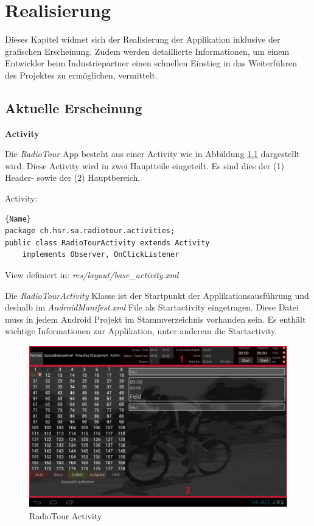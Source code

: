 \chapter{Realisierung}
\label{ref:realisierung}
Dieses Kapitel widmet sich der Realisierung der Applikation inklusive der grafischen Erscheinung. Zudem werden detaillierte Informationen, um einem Entwickler beim Industriepartner einen schnellen Einstieg in das Weiterführen des Projektes zu ermöglichen, vermittelt.


\section{Aktuelle Erscheinung}
\textbf{Activity}

Die \textit{RadioTour} App besteht aus einer Activity wie in Abbildung \ref{fig:gesamteactivity} dargestellt wird. Diese Activity wird in zwei Hauptteile eingeteilt. Es sind dies der (1) Header- sowie der (2) Hauptbereich. 

Activity:
\begin{lstlisting}{Name}
package ch.hsr.sa.radiotour.activities;
public class RadioTourActivity extends Activity 
	implements Observer, OnClickListener
\end{lstlisting}


View definiert in:
\textit{res/layout/base\_activity.xml}

Die \textit{RadioTourActivity} Klasse ist der Startpunkt der Applikationsausführung und deshalb im \textit{AndroidManifest.xml} File als Startactivity eingetragen. Diese Datei muss in jedem Android Projekt im Stammverzeichnis vorhanden sein. Es enthält wichtige Informationen zur Applikation, unter anderem die Startactivity.


\begin{figure}[h!]
\caption{RadioTour Activity}
\label{fig:gesamteactivity}
\centering
\includegraphics[scale=0.8]{07anhang/images/dev_activity.png}
\end{figure}

